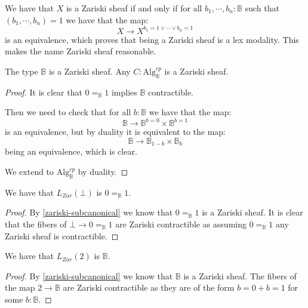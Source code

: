 \begin{remark}
We have that $X$ is a Zariski sheaf if and only if for all $b_1,\cdots,b_n:\mathbb{B}$ such that $(b_1,\cdots,b_n)=1$ we have that the map:
\[X\to X^{b_1=1\lor\cdots\lor b_n=1}\]
is an equivalence, which proves that being a Zariski sheaf is a lex modality. This makes the name Zariski sheaf reasonable.
\end{remark}


\begin{lemma}\label{zariski-subcanonical}
The type $\mathbb{B}$ is a Zariski sheaf. Any $C:\mathrm{Alg}^{cp}_\mathbb{B}$ is a Zariski sheaf.
\end{lemma}

\begin{proof}
It is clear that $0=_\mathbb{B}1$ implies $\mathbb{B}$ contractible.

Then we need to check that for all $b:\mathbb{B}$ we have that the map:
\[\mathbb{B} \to \mathbb{B}^{b=0}\times\mathbb{B}^{b=1}\]
is an equivalence, but by duality it is equivalent to the map:
\[\mathbb{B} \to \mathbb{B}_{1-b}\times\mathbb{B}_b\]
being an equivalence, which is clear.

We extend to $\mathrm{Alg}^{cp}_\mathbb{B}$ by duality.
\end{proof}

\begin{lemma}\label{bot-zariski}
We have that $L_{Zar}(\bot)$ is $0=_\mathbb{B}1$.
\end{lemma}

\begin{proof}
By \cref{zariski-subcanonical} we know that $0=_\mathbb{B}1$ is a Zariski sheaf. It is clear that the fibers of $\bot\to 0=_\mathbb{B}1$ are Zariski contractible as assuming $0=_\mathbb{B}1$ any Zariski sheaf is contractible.
\end{proof}

\begin{lemma}\label{bool-zariski}
We have that $L_{Zar}({2})$ is $\mathbb{B}$.
\end{lemma}

\begin{proof}
By \cref{zariski-subcanonical} we know that $\mathbb{B}$ is a Zariski sheaf. The fibers of the map ${2}\to\mathbb{B}$ are Zariski contractible as they are of the form $b=0+b=1$ for some $b:\mathbb{B}$.
\end{proof}

